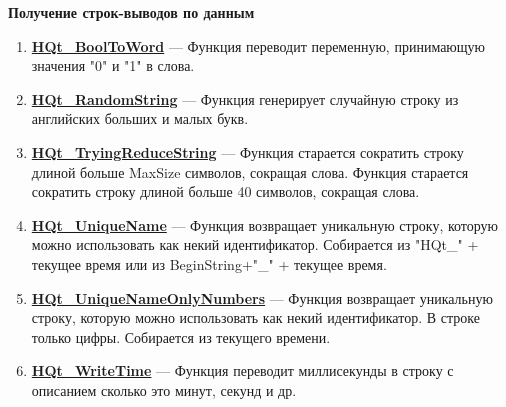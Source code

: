 \documentclass[a4paper,12pt]{article}
\begin{document}
\textbf{Получение строк-выводов по данным}
\begin{enumerate}

\item \textbf{\hyperref[HQt_BoolToWord]{HQt\_BoolToWord}} --- Функция переводит переменную, принимающую значения "0" и "1" в слова.

\item \textbf{\hyperref[HQt_RandomString]{HQt\_RandomString}} --- Функция генерирует случайную строку из английских больших и малых букв.

\item \textbf{\hyperref[HQt_TryingReduceString]{HQt\_TryingReduceString}} --- Функция старается сократить строку длиной больше MaxSize символов, сокращая слова. Функция старается сократить строку длиной больше 40 символов, сокращая слова.

\item \textbf{\hyperref[HQt_UniqueName]{HQt\_UniqueName}} --- Функция возвращает уникальную строку, которую можно использовать как некий идентификатор. Собирается из "HQt\_" + текущее время или из BeginString+"\_" + текущее время.

\item \textbf{\hyperref[HQt_UniqueNameOnlyNumbers]{HQt\_UniqueNameOnlyNumbers}} --- Функция возвращает уникальную строку, которую можно использовать как некий идентификатор. В строке только цифры. Собирается из текущего времени.

\item \textbf{\hyperref[HQt_WriteTime]{HQt\_WriteTime}} --- Функция переводит миллисекунды в строку с описанием сколько это минут, секунд и др.

\end{enumerate}
\end{document}
